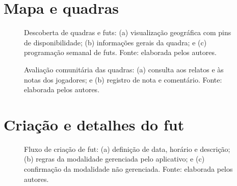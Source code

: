 \begin{apendicesenv}
    \section{Mapa e quadras}

    \begin{figure}[!htbp]
        \centering
        \hfill
        \hfill
        \caption[Descoberta de quadras e futs.]{Descoberta de quadras e futs: (a) visualização geográfica com pins de disponibilidade; (b) informações gerais da quadra; e (c) programação semanal de futs. Fonte: elaborada pelos autores.}
        \label{fig:prototipos-mapa-quadra}
    \end{figure}
    \clearpage

    \begin{figure}[!htbp]
        \centering
        \hfill
        \caption[Avaliação comunitária das quadras.]{Avaliação comunitária das quadras: (a) consulta aos relatos e às notas dos jogadores; e (b) registro de nota e comentário. Fonte: elaborada pelos autores.}
        \label{fig:prototipos-avaliacoes-quadra}
    \end{figure}
    \clearpage

    \section{Criação e detalhes do fut}

    \begin{figure}[!htbp]
        \centering
        \hfill
        \hfill
        \caption[Fluxo de criação de fut.]{Fluxo de criação de fut: (a) definição de data, horário e descrição; (b) regras da modalidade gerenciada pelo aplicativo; e (c) confirmação da modalidade não gerenciada. Fonte: elaborada pelos autores.}
        \label{fig:prototipos-criacao-fut}
    \end{figure}
    \clearpage


\end{apendicesenv}
